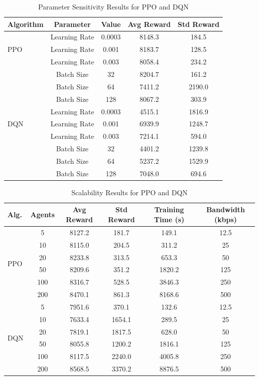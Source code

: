 \documentclass[preprint,12pt]{elsarticle}
\begin{document}
\begin{table}%
\centering
\caption{Parameter Sensitivity Results for PPO and DQN}
\begin{tabular}{lcccc}
\hline
\textbf{Algorithm} & \textbf{Parameter} & \textbf{Value} & \textbf{Avg Reward} & \textbf{Std Reward} \\
\hline
\multirow{3}{*}{PPO} & Learning Rate & 0.0003 & 8148.3 & 184.5 \\
 & Learning Rate & 0.001 & 8183.7 & 128.5 \\
 & Learning Rate & 0.003 & 8058.4 & 234.2 \\

 & Batch Size & 32 & 8204.7 & 161.2 \\
 & Batch Size & 64 & 7411.2 & 2190.0 \\
 & Batch Size & 128 & 8067.2 & 303.9 \\
\hline
\multirow{3}{*}{DQN} & Learning Rate & 0.0003 & 4515.1 & 1816.9 \\
 & Learning Rate & 0.001 & 6939.9 & 1248.7 \\
 & Learning Rate & 0.003 & 7214.1 & 594.0 \\

 & Batch Size & 32 & 4401.2 & 1239.8 \\
 & Batch Size & 64 & 5237.2 & 1529.9 \\
 & Batch Size & 128 & 7048.0 & 694.6 \\
\hline
\end{tabular}
\label{sensitivitytable}
\end{table}



\begin{table}%
\centering
\caption{Scalability Results for PPO and DQN}
\begin{tabular}{lccccc}
\hline
\textbf{Alg.} & \textbf{Agents} & \textbf{Avg Reward} & \textbf{Std Reward} & \textbf{Training Time (s)} & \textbf{Bandwidth (kbps)} \\
\hline
\multirow{6}{*}{PPO} & 5 & 8127.2 & 181.7 & 149.1 & 12.5 \\
 & 10 & 8115.0 & 204.5 & 311.2 & 25 \\
 & 20 & 8233.8 & 313.5 & 653.3 & 50 \\
 & 50 & 8209.6 & 351.2 & 1820.2 & 125 \\
 & 100 & 8316.7 & 528.5 & 3846.3 & 250 \\
 & 200 & 8470.1 & 861.3 & 8168.6 & 500 \\
\hline
\multirow{6}{*}{DQN} & 5 & 7951.6 & 370.1 & 132.6 & 12.5 \\
 & 10 & 7633.4 & 1654.1 & 289.5 & 25 \\
 & 20 & 7819.1 & 1817.5 & 628.0 & 50 \\
 & 50 & 8055.8 & 1200.2 & 1816.1 & 125 \\
 & 100 & 8117.5 & 2240.0 & 4005.8 & 250 \\
 & 200 & 8568.5 & 3370.2 & 8876.5 & 500 \\
\hline
\end{tabular}
\label{scalabilitytable}
\end{table}
\end{document}

